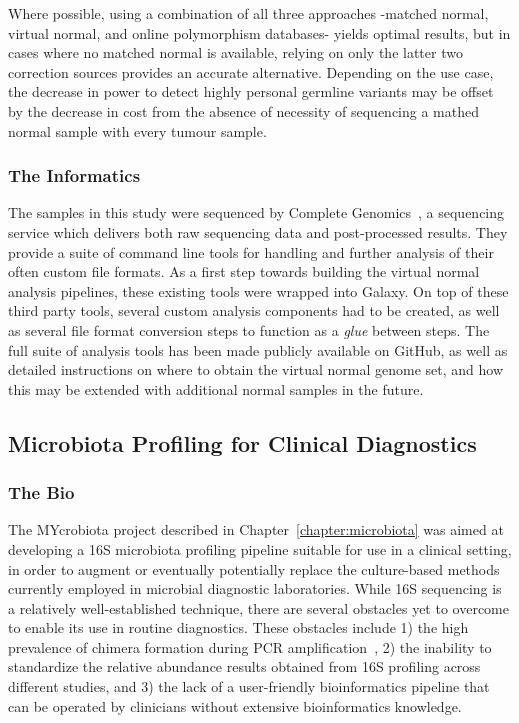 Where possible, using a combination of all three approaches -matched normal, virtual normal, and online polymorphism databases- yields optimal results, but in cases where no matched normal is available, relying on only the latter two correction sources provides an accurate alternative. Depending on the use case, the decrease in power to detect highly personal germline variants may be offset by the decrease in cost from the absence of necessity of sequencing a mathed normal sample with every tumour sample.

\subsubsection{The Informatics}
The samples in this study were sequenced by Complete Genomics~\cite{drmanac}, a sequencing service which delivers both raw sequencing data and post-processed results. They provide a suite of command line tools for handling and further analysis of their often custom file formats. As a first step towards building the virtual normal analysis pipelines, these existing tools were wrapped into Galaxy. On top of these third party tools, several custom analysis components had to be created, as well as several file format conversion steps to function as a \emph{glue} between steps. The full suite of analysis tools has been made publicly available on GitHub, as well as detailed instructions on where to obtain the virtual normal genome set, and how this may be extended with additional normal samples in the future.


\subsection{Microbiota Profiling for Clinical Diagnostics}
\subsubsection{The Bio}
The MYcrobiota project described in Chapter~\ref{chapter:microbiota} was aimed at developing a 16S microbiota profiling pipeline suitable for use in a clinical setting, in order to augment or eventually potentially replace the culture-based methods currently employed in microbial diagnostic laboratories. While 16S sequencing is a relatively well-established technique, there are several obstacles yet to overcome to enable its use in routine diagnostics. These obstacles include 1) the high prevalence of chimera formation during PCR amplification~\cite{huttenhower2012structure}, 2) the inability to standardize the relative abundance results obtained from 16S profiling across different studies, and 3) the lack of a user-friendly bioinformatics pipeline that can be operated by clinicians without extensive bioinformatics knowledge.

